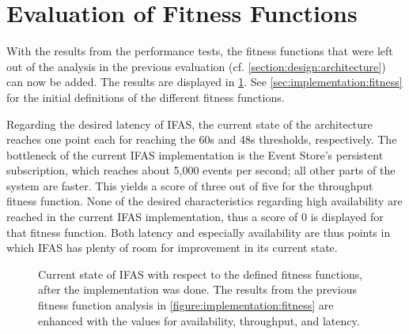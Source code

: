 \section{Evaluation of Fitness Functions}
\label{sec:evaluation:fitness}

With the results from the performance tests, the fitness functions that were left out of the analysis in the previous evaluation (cf. \cref{section:design:architecture}) can now be added.
The results are displayed in \cref{figure:evaluation:fitness}.
See \cref{sec:implementation:fitness} for the initial definitions of the different fitness functions.

Regarding the desired latency of \ac{IFAS}, the current state of the architecture reaches one point each for reaching the 60s and 48s thresholds, respectively.
The bottleneck of the current \ac{IFAS} implementation is the Event Store's persistent subscription, which reaches about 5,000 events per second; all other parts of the system are faster.
This yields a score of three out of five for the throughput fitness function.
None of the desired characteristics regarding high availability are reached in the current \ac{IFAS} implementation, thus a score of 0 is displayed for that fitness function.
Both latency and especially availability are thus points in which \ac{IFAS} has plenty of room for improvement in its current state.

\begin{figure}[t]
        \caption[Current state of \ac{IFAS} with respect to the defined fitness functions, after the evalatuion was done.]{
        Current state of \ac{IFAS} with respect to the defined fitness functions, after the implementation was done.
        The results from the previous fitness function analysis in \cref{figure:implementation:fitness} are enhanced with the values for availability, throughput, and latency.
        }
        \label{figure:evaluation:fitness}
\end{figure}
